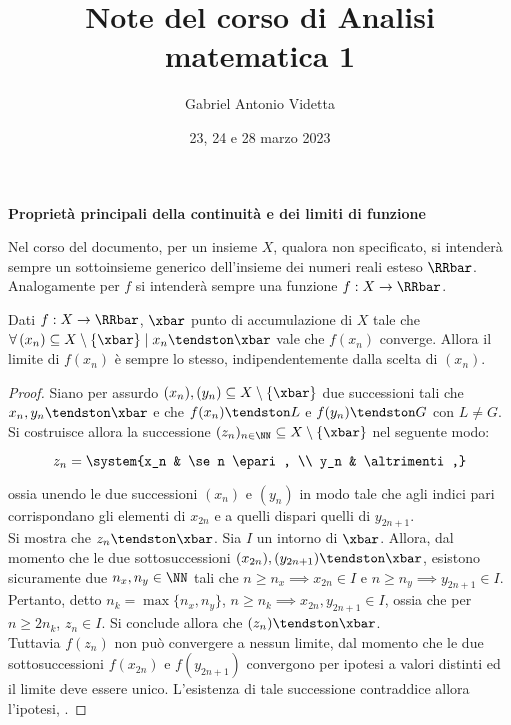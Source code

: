 \documentclass[11pt]{article}
\title{\textbf{Note del corso di Analisi matematica 1}}
\author{Gabriel Antonio Videtta}
\date{23, 24 e 28 marzo 2023}
\begin{document}
	
	\maketitle
	
	\begin{center}
		\Large \textbf{Proprietà principali della continuità e dei limiti di funzione}
	\end{center}
	
	\begin{note} Nel corso del documento, per un insieme $X$, qualora non
		specificato, si intenderà sempre un sottoinsieme generico dell'insieme
		dei numeri reali esteso $\RRbar$. Analogamente per $f$ si intenderà
		sempre una funzione $f : X \to \RRbar$.
	\end{note}
	
	\begin{proposition}
		Dati $f : X \to \RRbar$, $\xbar$ punto di accumulazione di $X$
		tale che $\forall \, (x_n) \subseteq X \setminus \{\xbar\} \mid x_n \tendston \xbar$ vale che
		$f(x_n)$ converge. Allora il limite di $f(x_n)$ è sempre lo stesso, indipendentemente
		dalla scelta di $(x_n)$.
	\end{proposition}

	\begin{proof}
		Siano per assurdo $(x_n), (y_n) \subseteq X \setminus \{\xbar\}$ due successioni tali che
		$x_n, y_n \tendston \xbar$ e che $f(x_n) \tendston L$ e $f(y_n) \tendston G$ con $L \neq G$. Si
		costruisce allora la successione $(z_n)_{n \in \NN} \subseteq X \setminus \{\xbar\}$ nel seguente modo:
		
		\[ z_n = \system{x_n & \se n \epari, \\ y_n & \altrimenti,} \]
		
		\vskip 0.05in
		
		ossia unendo le due successioni $(x_n)$ e $(y_n)$ in modo tale che agli indici pari corrispondano gli
		elementi di $x_{2n}$ e a quelli dispari quelli di $y_{2n+1}$. \\
		
		Si mostra che $z_n \tendston \xbar$. Sia $I$ un intorno di $\xbar$. Allora, dal momento che le due sottosuccessioni
		$(x_{2n}), (y_{2n+1}) \tendston \xbar$, esistono sicuramente due
		$n_x, n_y \in \NN$ tali che $n \geq n_x \implies x_{2n} \in I$ e $n \geq n_y \implies y_{2n+1} \in I$. Pertanto,
		detto $n_k = \max\{n_x, n_y\}$, $n \geq n_k \implies x_{2n}, y_{2n+1} \in I$, ossia che per $n \geq 2 n_k$,
		$z_n \in I$. Si conclude allora che $(z_n) \tendston \xbar$. \\
		
		Tuttavia $f(z_n)$ non può convergere a nessun limite, dal momento che le due sottosuccessioni
		$f(x_{2n})$ e $f(y_{2n+1})$ convergono per ipotesi a valori distinti ed il limite deve essere unico. L'esistenza di
		tale successione contraddice allora l'ipotesi, \Lightning.
	\end{proof}
\end{document}
